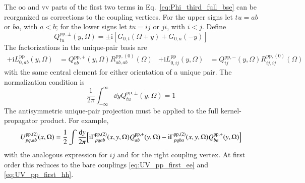\documentclass[aip,jcp,reprint,noshowkeys,superscriptaddress]{revtex4-1}
\newcommand{\ii}{\mathrm{i}}
\newcommand{\pp}{\text{pp}}
\begin{document}
The $\text{oo}$ and $\text{vv}$ parts of the first two terms in
Eq.~\eqref{eq:Phi_third_full_bse} can be reorganized as corrections to
the coupling vertices.
For the upper signs let $tu=ab$ or $ba$, with $a<b$; for the lower signs
let $tu=ij$ or $ji$, with $i<j$. Define
\begin{equation}
    Q_{tu}^{\pp,\pm}(y,\Omega)
    =\pm\ii\left[G_{0,t}(\Omega+y)+G_{0,u}(-y)\right]
    \label{eq:Q_pp_pm}
\end{equation}
The factorizations in the unique-pair basis are
\begin{align}
    +\ii L_{0,ab}^{\pp}(y,\Omega)
    &=Q_{ab}^{\pp,+}(y,\Omega)R_{ab,ab}^{\pp,(0)}(\Omega)
    &
    +\ii L_{0,ij}^{\pp}(y,\Omega)
    &=Q_{ij}^{\pp,-}(y,\Omega)R_{ij,ij}^{\pp,(0)}(\Omega)
    \label{eq:pp_oriented_factorization}
\end{align}
with the same central element for either orientation of a unique pair.
The normalization condition is
\begin{equation}
    \frac{1}{2\pi}\int_{-\infty}^{\infty}\dd{y}
    Q_{tu}^{\pp,\pm}(y,\Omega)=1
    \label{eq:Q_pp_normalization}
\end{equation}
The antisymmetric unique-pair projection must be applied to the full
kernel-propagator product.  For example,
\begin{equation}
    U_{pq,ab}^{\pp,(2)}(x,\Omega)
    =
    \frac12\int\frac{\dd{y}}{2\pi}
    \qty[
    \ii\Gamma_{pqab}^{\pp,(2)}(x,y,\Omega)
    Q_{ab}^{\pp,+}(y,\Omega)
    -
    \ii\Gamma_{pqba}^{\pp,(2)}(x,y,\Omega)
    Q_{ba}^{\pp,+}(y,\Omega)
    ]
\label{eq:U_pp_second_projection_ab}
\end{equation}
with the analogous expression for $ij$ and for the right coupling vertex.
At first order this reduces to the bare couplings
\eqref{eq:UV_pp_first_ee} and \eqref{eq:UV_pp_first_hh}.
\end{document}
